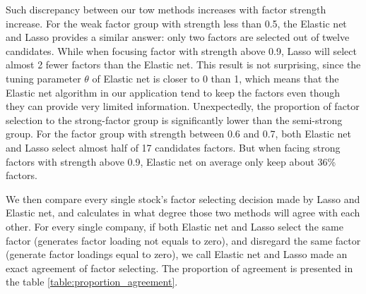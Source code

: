 Such discrepancy between our tow methods increases with factor strength increase.
For the weak factor group with strength less than 0.5, the Elastic net and Lasso provides a similar answer: only two factors are selected out of twelve candidates.
While when focusing factor with strength above 0.9, Lasso will select almost 2 fewer factors than the Elastic net.
This result is not surprising, since the tuning parameter $\theta$ of Elastic net is closer to 0 than 1, which means that the Elastic net algorithm in our application tend to keep the factors even though they can provide very limited information.
Unexpectedly, the proportion of factor selection to the strong-factor group is significantly lower than the semi-strong group.
For the factor group with strength between 0.6 and 0.7, both Elastic net and Lasso select almost half of 17 candidates factors. 
But when facing strong factors with strength above 0.9, Elastic net on average only keep about 36\% factors.


We then compare every single stock's factor selecting decision made by Lasso and Elastic net, and calculates in what degree those two methods will agree with each other.
For every single company, if both Elastic net and Lasso select the same factor (generates factor loading not equals to zero), and disregard the same factor (generate factor loadings equal to zero), we call Elastic net and Lasso made an exact agreement of factor selecting.
The proportion of agreement is presented in the table \ref{table:proportion_agreement}.

